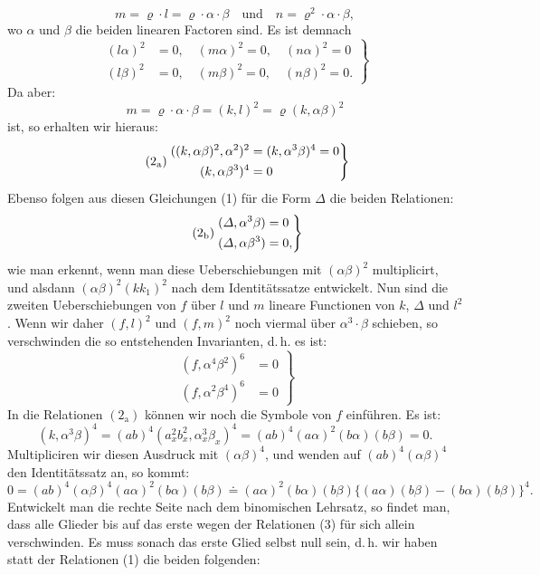 \documentclass[11pt]{article}
\providecommand{\weq}[2]{\begin{equation}\tag{#1}#2\end{equation}}
\begin{document}
\[
m=\varrho\cdot l=\varrho\cdot\alpha\cdot\beta\quad\text{und}\quad n=\varrho^2\cdot\alpha\cdot\beta,
\]
wo $\alpha$ und $\beta$ die beiden linearen Factoren sind. Es ist demnach
\weq{1}{
\left.\begin{aligned}
(l\alpha)^2&=0,\quad (m\alpha)^2=0,\quad (n\alpha)^2=0\\
(l\beta)^2&=0,\quad (m\beta)^2=0,\quad (n\beta)^2=0.
\end{aligned}\right\}
}
Da aber:
\[
m=\varrho\cdot\alpha\cdot\beta=(k,l)^2=\varrho(k,\alpha\beta)^2
\]
ist, so erhalten wir hieraus:
\weq{$2_{\mathrm{a}}$}{
\left.\begin{aligned}
((k,\alpha\beta)^2,\alpha^2)^2&=(k,\alpha^3\beta)^4=0\\
(k,\alpha\beta^3)^4&=0
\end{aligned}\right\}
}
Ebenso folgen aus diesen Gleichungen (1) für die Form $\varDelta$ die beiden Relationen:
\weq{$2_{\mathrm{b}}$}{
\left.\begin{aligned}
(\varDelta,\alpha^3\beta)&=0\\
(\varDelta,\alpha\beta^3)&=0,
\end{aligned}\right\}
}
wie man erkennt, wenn man diese Ueberschiebungen mit $(\alpha\beta)^2$ multiplicirt, und alsdann $(\alpha\beta)^2(kk_1)^2$ nach dem Identitätssatze entwickelt.
Nun sind die zweiten Ueberschiebungen von $f$ über $l$ und $m$ lineare Functionen von $k$, $\varDelta$ und $l^2$. Wenn wir daher $(f,l)^2$ und $(f,m)^2$ noch viermal über $\alpha^3\cdot\beta$ schieben, so verschwinden die so entstehenden Invarianten, d.\,h. es ist:
\weq{3}{
\left.\begin{aligned}
(f,\alpha^4\beta^2)^6&=0\\
(f,\alpha^2\beta^4)^6&=0
\end{aligned}\right\}
}
In die Relationen $(2_{\mathrm{a}})$ können wir noch die Symbole von $f$ einführen. Es ist:
\[
(k,\alpha^3\beta)^4=(ab)^4(a_x^2b_x^2,\alpha_x^3\beta_x)^4=(ab)^4(a\alpha)^2(b\alpha)(b\beta)=0.
\]
Multipliciren wir diesen Ausdruck mit $(\alpha\beta)^4$, und wenden auf $(ab)^4(\alpha\beta)^4$ den Identitätssatz an, so kommt:
\[
0=(ab)^4(\alpha\beta)^4(a\alpha)^2(b\alpha)(b\beta)\doteq(a\alpha)^2(b\alpha)(b\beta)\{(a\alpha)(b\beta)-(b\alpha)(b\beta)\}^4.
\]
Entwickelt man die rechte Seite nach dem binomischen Lehrsatz, so findet man, dass alle Glieder bis auf das erste wegen der Relationen (3) für sich allein verschwinden. Es muss sonach das erste Glied selbst null sein, d.\,h. wir haben statt der Relationen (1) die beiden folgenden:
\end{document}
